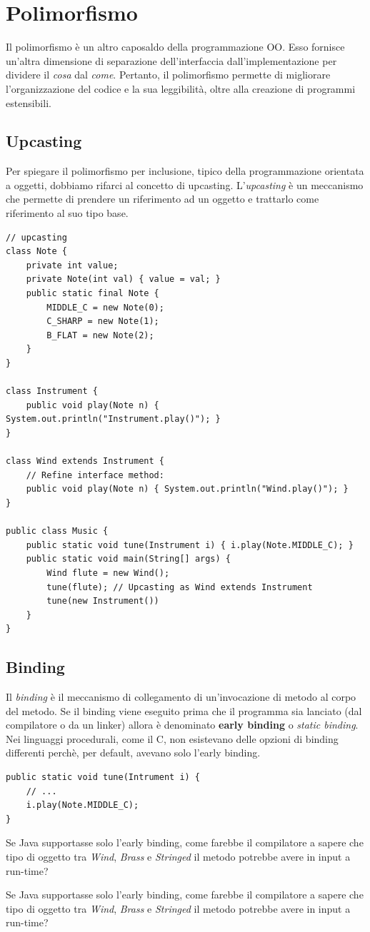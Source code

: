 \documentclass[12pt]{report}
\begin{document}
\section{Polimorfismo}
Il polimorfismo è un altro caposaldo della programmazione OO. Esso fornisce un'altra dimensione di separazione dell'interfaccia dall'implementazione per dividere il \textit{cosa} dal  \textit{come}. Pertanto, il polimorfismo permette di migliorare l'organizzazione del codice e la sua leggibilità, oltre alla creazione di programmi estensibili.
\subsection{Upcasting}
Per spiegare il polimorfismo per inclusione, tipico della programmazione orientata a oggetti, dobbiamo rifarci al concetto di upcasting. L'\textit{upcasting} è un meccanismo che permette di prendere un riferimento ad un oggetto e trattarlo come riferimento al suo tipo base.
\begin{lstlisting}[style=javastyle]
// upcasting
class Note {
	private int value;
	private Note(int val) { value = val; }
	public static final Note {
		MIDDLE_C = new Note(0);
		C_SHARP = new Note(1);
		B_FLAT = new Note(2);
	}
}

class Instrument {
	public void play(Note n) { System.out.println("Instrument.play()"); }
}

class Wind extends Instrument {
	// Refine interface method:
	public void play(Note n) { System.out.println("Wind.play()"); }
}

public class Music {
	public static void tune(Instrument i) { i.play(Note.MIDDLE_C); }
	public static void main(String[] args) {
		Wind flute = new Wind();
		tune(flute); // Upcasting as Wind extends Instrument
		tune(new Instrument())
	}
}
\end{lstlisting}
\subsection{Binding}
Il \textit{binding} è il meccanismo di collegamento di un'invocazione di metodo al corpo del metodo. Se il binding viene eseguito prima che il programma sia lanciato (dal compilatore o da un linker) allora è denominato \textbf{early binding} o \textit{static binding}. Nei linguaggi procedurali, come il C, non esistevano delle opzioni di binding differenti perchè, per default, avevano solo l'early binding.
\begin{example}{}{}
\begin{lstlisting}[style=javastyle]
public static void tune(Intrument i) {
	// ...
	i.play(Note.MIDDLE_C);
}
\end{lstlisting}
Se Java supportasse solo l'early binding, come farebbe il compilatore a sapere che tipo di oggetto tra \textit{Wind}, \textit{Brass} e \textit{Stringed} il metodo potrebbe avere in input a run-time?
\end{example}
Se Java supportasse solo l'early binding, come farebbe il compilatore a sapere che tipo di oggetto tra \textit{Wind}, \textit{Brass} e \textit{Stringed} il metodo potrebbe avere in input a run-time?
\end{document}
